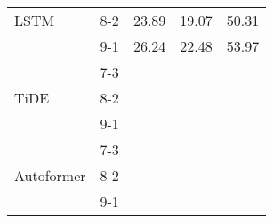 \begin{table}[h!]
\begin{tabular}{|l|c|c|c|c|}
    \rowcolor{white} LSTM & 8-2 & 23.89 & 19.07 & 50.31 \\ 
    \rowcolor{white} & 9-1 & 26.24 & 22.48 & 53.97 \\ \hline
    \rowcolor{green!30} & 7-3 &  &  &  \\ 
    \rowcolor{green!30} TiDE & 8-2 &  &  &  \\ 
    \rowcolor{green!30} & 9-1 &  &  &  \\ \hline
    \rowcolor{white} & 7-3 &  &  &  \\ 
    \rowcolor{white} Autoformer & 8-2 &  &  &  \\ 
    \rowcolor{white} & 9-1 &  &  &  \\ \hline

    \end{tabular}
\end{table}